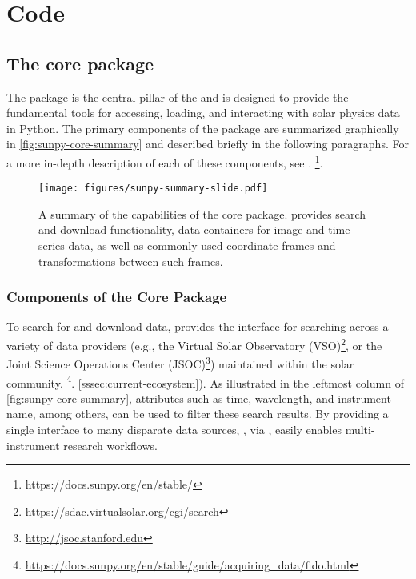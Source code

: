 \section{Code}
\label{sec:code}

\subsection{The \sunpypkg core package}
\label{ssec:the-sunpypkg-core-package}

The \sunpypkg package is the central pillar of the \sunpyproj \citep{sunpy_community2020} and is designed to provide the fundamental tools for accessing, loading, and interacting with solar physics data in Python.
The primary components of the \sunpypkg package are summarized graphically in \autoref{fig:sunpy-core-summary} and described briefly in the following paragraphs.
For a more in-depth description of each of these components, see \citet[Section 4]{sunpy_community2020}.
\footnote{https://docs.sunpy.org/en/stable/}.

\begin{figure}
    \centering
    \texttt{[image: figures/sunpy-summary-slide.pdf]}
    \caption{A summary of the capabilities of the \sunpypkg core package. \sunpypkg provides search and download functionality, data containers for image and time series data, as well as commonly used coordinate frames and transformations between such frames.}
    \label{fig:sunpy-core-summary}
\end{figure}

\subsubsection{Components of the Core Package}
\label{sssection:core-components}

To search for and download data, \sunpypkg provides the \Fido interface for searching across a variety of data providers (e.g., the Virtual Solar Observatory (VSO)\footnote{\url{https://sdac.virtualsolar.org/cgi/search}}, or the Joint Science Operations Center (JSOC)\footnote{\url{http://jsoc.stanford.edu}}) maintained within the solar community.
\footnote{\url{https://docs.sunpy.org/en/stable/guide/acquiring_data/fido.html}}.
 \citep{sunpy_community2020} 
 \autoref{sssec:current-ecosystem}).
As illustrated in the leftmost column of \autoref{fig:sunpy-core-summary}, attributes such as time, wavelength, and instrument name, among others, can be used to filter these search results.
By providing a single interface to many disparate data sources, \sunpypkg, via \Fido, easily enables multi-instrument research workflows.

